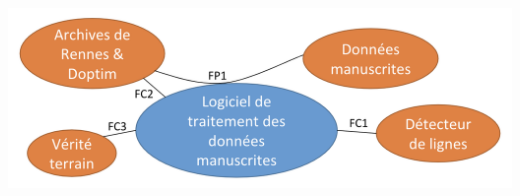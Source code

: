 \paragraph{}
\begin{mdframed}
\begin{center}
\includegraphics[width=\linewidth]{pieuvre.png}
\end{center}
\end{mdframed}